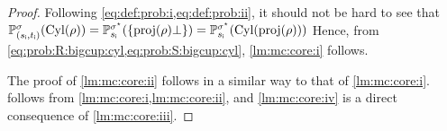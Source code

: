 \begin{proof}
  Following \cref{eq:def:prob:i,eq:def:prob:ii}, it should not be hard
  to see that
  $\mathbb{P}^{\sigma}_{({s_{\textsf{i}}},{t_{\textsf{i}}})}(\mathrm{Cyl}(\rho)) =
  \mathbb{P}^{\sigma^\star}_{{s_{\textsf{i}}}}(\{\mathrm{proj}(\rho)\bot\}) =
  \mathbb{P}^{\sigma^\star}_{{s_{\textsf{i}}}}(\mathrm{Cyl}(\mathrm{proj}(\rho)))$
  Hence, from \cref{eq:prob:R:bigcup:cyl,eq:prob:S:bigcup:cyl},
  \cref{lm:mc:core:i} follows.



  
  The proof of \cref{lm:mc:core:ii} follows in a similar way to that
  of \cref{lm:mc:core:i}. 
   follows from
  \cref{lm:mc:core:i,lm:mc:core:ii}, and \cref{lm:mc:core:iv} is a
  direct consequence of \cref{lm:mc:core:iii}.  
\end{proof}

